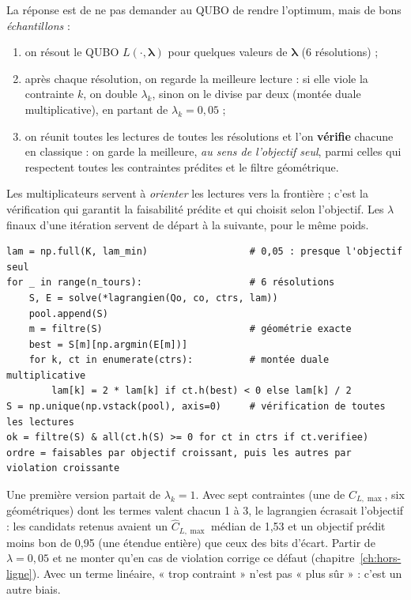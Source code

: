 La réponse est de ne pas demander au QUBO de rendre l'optimum, mais de bons \emph{échantillons} :
\begin{enumerate}
\item on résout le QUBO $L(\cdot,\boldsymbol\lambda)$ pour quelques valeurs de $\boldsymbol\lambda$ (6 résolutions) ;
\item après chaque résolution, on regarde la meilleure lecture : si elle viole la contrainte $k$, on double $\lambda_k$, sinon on le divise par deux (montée duale multiplicative), en partant de $\lambda_k=0{,}05$ ;
\item on réunit toutes les lectures de toutes les résolutions et l'on \textbf{vérifie} chacune en classique : on garde la meilleure, \emph{au sens de l'objectif seul}, parmi celles qui respectent toutes les contraintes prédites et le filtre géométrique.
\end{enumerate}
Les multiplicateurs servent à \emph{orienter} les lectures vers la frontière ; c'est la vérification qui garantit la faisabilité prédite et qui choisit selon l'objectif. Les $\lambda$ finaux d'une itération servent de départ à la suivante, pour le même poids.

\begin{codebox}
\begin{lstlisting}
lam = np.full(K, lam_min)                  # 0,05 : presque l'objectif seul
for _ in range(n_tours):                   # 6 résolutions
    S, E = solve(*lagrangien(Qo, co, ctrs, lam))
    pool.append(S)
    m = filtre(S)                          # géométrie exacte
    best = S[m][np.argmin(E[m])]
    for k, ct in enumerate(ctrs):          # montée duale multiplicative
        lam[k] = 2 * lam[k] if ct.h(best) < 0 else lam[k] / 2
S = np.unique(np.vstack(pool), axis=0)     # vérification de toutes les lectures
ok = filtre(S) & all(ct.h(S) >= 0 for ct in ctrs if ct.verifiee)
ordre = faisables par objectif croissant, puis les autres par violation croissante
\end{lstlisting}
\end{codebox}

\begin{piege}
Une première version partait de $\lambda_k=1$. Avec sept contraintes (une de $C_{L,\max}$, six géométriques) dont les termes valent chacun 1 à 3, le lagrangien écrasait l'objectif : les candidats retenus avaient un $\hat C_{L,\max}$ médian de 1,53 et un objectif prédit moins bon de 0,95 (une étendue entière) que ceux des bits d'écart. Partir de $\lambda=0{,}05$ et ne monter qu'en cas de violation corrige ce défaut (chapitre~\ref{ch:hors-ligne}). Avec un terme linéaire, « trop contraint » n'est pas « plus sûr » : c'est un autre biais.
\end{piege}

